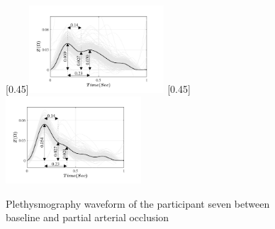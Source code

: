 \begin{figure}
	\centering
	\null\hfill%
	[0.45\textwidth]{\includegraphics[width=0.45\textwidth, trim={0.5cm 0cm 1.5cm 0 cm}, clip]{figure_apa_4a}}%
	\hfill%
	[0.45\textwidth]{\includegraphics[width=0.45\textwidth, trim={0.5cm 0cm 1.5cm 0 cm}, clip]{figure_apa_4b}}%
	\hfill\null%
	\caption{Plethysmography waveform of the participant seven between baseline and partial arterial occlusion}
	\label{fig:iPG arterial}

	\vspace{1cm}


\end{figure}
